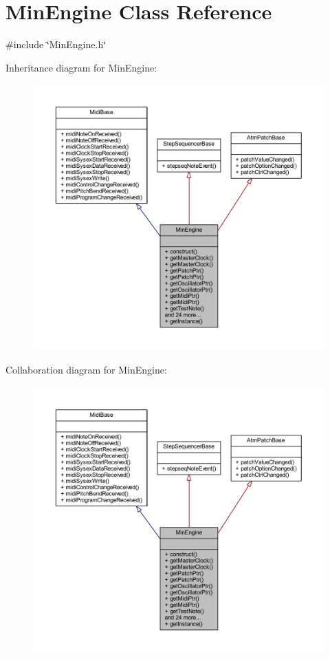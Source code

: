\hypertarget{class_min_engine}{}\section{Min\+Engine Class Reference}
\label{class_min_engine}


{\ttfamily \#include \char`\"{}Min\+Engine.\+h\char`\"{}}



Inheritance diagram for Min\+Engine\+:
\nopagebreak
\begin{figure}[H]
\begin{center}
\leavevmode
\includegraphics[width=350pt]{df/dbb/class_min_engine__inherit__graph}
\end{center}
\end{figure}


Collaboration diagram for Min\+Engine\+:
\nopagebreak
\begin{figure}[H]
\begin{center}
\leavevmode
\includegraphics[width=350pt]{d9/d28/class_min_engine__coll__graph}
\end{center}
\end{figure}
